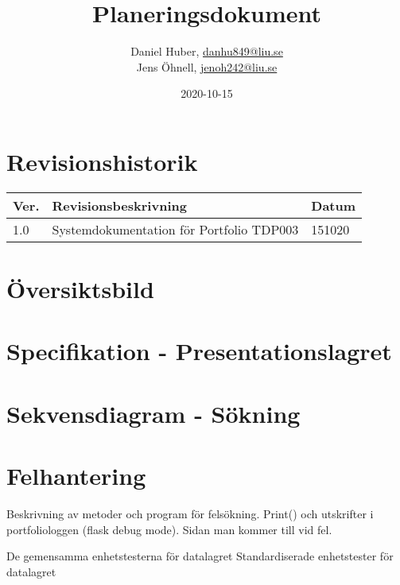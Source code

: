 \documentclass{TDP003mall}
\author{Daniel Huber, \url{danhu849@liu.se}\\
  Jens Öhnell, \url{jenoh242@liu.se}}
\title{Planeringsdokument}
\date{2020-10-15}
\begin{document}
\projectpage
\section{Revisionshistorik}
\begin{table}[!h]
\begin{tabularx}{\linewidth}{|l|X|l|}
\hline
Ver. & Revisionsbeskrivning & Datum \\\hline
1.0 & Systemdokumentation för Portfolio TDP003 & 151020 \\\hline
\end{tabularx}
\end{table}


\section{Översiktsbild}

\section{Specifikation - Presentationslagret}

\section{Sekvensdiagram - Sökning}



\section{Felhantering}
Beskrivning av metoder och program för felsökning. Print() och utskrifter i portfoliologgen (flask debug mode). Sidan man kommer till vid fel.

De gemensamma enhetstesterna för datalagret
Standardiserade enhetstester för datalagret
\end{document}
